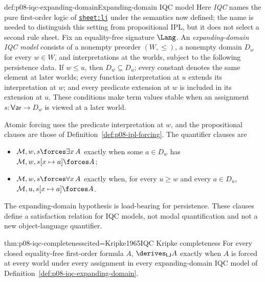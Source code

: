 \begin{hbdefinition}{def:p08-iqc-expanding-domain}{Expanding-domain IQC model}
Here \emph{IQC} names the pure first-order logic of
\hyperref[sheet:lj]{\texttt{sheet:lj}} under the semantics now defined; the
name is needed to distinguish this setting from propositional IPL, but it does
not select a second rule sheet.  Fix an equality-free signature \(\Lang\).
An \emph{expanding-domain IQC model} consists of a nonempty preorder
\((W,\leq)\), a nonempty domain \(D_w\) for every \(w\in W\), and
interpretations at the worlds, subject to the following persistence data.
If \(w\leq u\), then \(D_w\subseteq D_u\); every constant denotes the same
element at later worlds; every function interpretation at \(u\) extends its
interpretation at \(w\); and every predicate extension at \(w\) is included in
its extension at \(u\).  These conditions make term values stable when an
assignment \(s:\mathsf{Var}\to D_w\) is viewed at a later world.

Atomic forcing uses the predicate interpretation at \(w\), and the
propositional clauses are those of
Definition~\ref{def:p08-ipl-forcing}.  The quantifier clauses are

\begin{itemize}
\item \(\mathcal M,w,s\forces\exists x\,A\) exactly when some
  \(a\in D_w\) has
  \(\mathcal M,w,s[x\mapsto a]\forces A\);
\item \(\mathcal M,w,s\forces\forall x\,A\) exactly when, for every
  \(u\geq w\) and every \(a\in D_u\),
  \(\mathcal M,u,s[x\mapsto a]\forces A\).
\end{itemize}

The expanding-domain hypothesis is load-bearing for persistence.  These
clauses define a satisfaction relation for IQC models, not modal
quantification and not a new object-language quantifier.
\end{hbdefinition}

\begin{hbtheorem}{thm:p08-iqc-completeness}{cited=Kripke1965}{IQC Kripke completeness}
For every closed equality-free first-order formula \(A\),
\(\derives_{\mathsf{LJ}}A\) exactly when \(A\) is forced at every world under
every assignment in every expanding-domain IQC model of
Definition~\ref{def:p08-iqc-expanding-domain}.
\end{hbtheorem}

